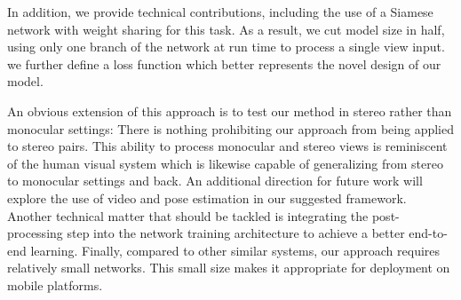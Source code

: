 \documentclass[10pt,twocolumn,letterpaper]{article}
\begin{document}
In addition, we provide technical contributions, including the use of a Siamese network with weight sharing for this task. As a result, we cut model size in half, using only one branch of the network at run time to process a single view input. we further define a loss function which better represents the novel design of our model.


An obvious extension of this approach is to test our method in stereo rather than monocular settings: There is nothing prohibiting our approach from being applied to stereo pairs. This ability to process monocular and stereo views is reminiscent of the human visual system which is likewise capable of generalizing from stereo to monocular settings and back. An additional direction for future work will explore the use of video and pose estimation in our suggested framework. Another technical matter that should be tackled is integrating the post-processing step into the network training
architecture to achieve a better end-to-end learning. Finally, compared to other similar systems, our approach requires relatively small networks. This small size makes it appropriate for deployment on mobile platforms.
\end{document}
